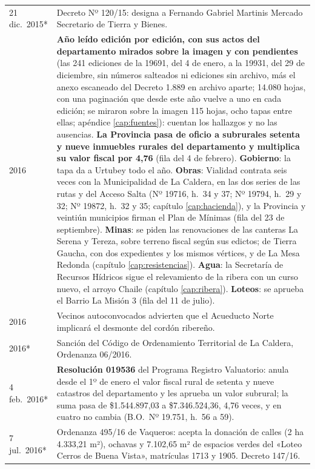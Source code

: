 \begin{longtable}{@{}p{2.7cm}p{10.3cm}@{}}
21 dic.\ 2015* & Decreto Nº 120/15: designa a Fernando Gabriel Martinis Mercado Secretario de Tierra y Bienes. \\
2016 & \textbf{Año leído edición por edición, con sus actos del departamento mirados sobre la imagen y con pendientes} (las 241 ediciones de la 19691, del 4 de enero, a la 19931, del 29 de diciembre, sin números salteados ni ediciones sin archivo, más el anexo escaneado del Decreto 1.889 en archivo aparte; 14.080 hojas, con una paginación que desde este año vuelve a uno en cada edición; se miraron sobre la imagen 115 hojas, ocho tapas entre ellas; apéndice \ref{cap:fuentes}): cuentan los hallazgos y no las ausencias. \textbf{La Provincia pasa de oficio a subrurales setenta y nueve inmuebles rurales del departamento y multiplica su valor fiscal por 4,76} (fila del 4 de febrero). \textbf{Gobierno}: la tapa da a Urtubey todo el año. \textbf{Obras}: Vialidad contrata seis veces con la Municipalidad de La Caldera, en las dos series de las rutas y del Acceso Salta (Nº 19716, h.\ 34 y 37; Nº 19794, h.\ 29 y 32; Nº 19872, h.\ 32 y 35; capítulo \ref{cap:hacienda}), y la Provincia y veintiún municipios firman el Plan de Mínimas (fila del 23 de septiembre). \textbf{Minas}: se piden las renovaciones de las canteras La Serena y Tereza, sobre terreno fiscal según sus edictos; de Tierra Gaucha, con dos expedientes y los mismos vértices, y de La Mesa Redonda (capítulo \ref{cap:resistencias}). \textbf{Agua}: la Secretaría de Recursos Hídricos sigue el relevamiento de la ribera con un curso nuevo, el arroyo Chaile (capítulo \ref{cap:ribera}). \textbf{Loteos}: se aprueba el Barrio La Misión 3 (fila del 11 de julio). \\
2016 & Vecinos autoconvocados advierten que el Acueducto Norte implicará el desmonte del cordón ribereño. \\
2016* & Sanción del Código de Ordenamiento Territorial de La Caldera, Ordenanza 06/2016. \\
4 feb.\ 2016* & \textbf{Resolución 019536} del Programa Registro Valuatorio: anula desde el 1º de enero el valor fiscal rural de setenta y nueve catastros del departamento y les aprueba un valor subrural; la suma pasa de \$1.544.897,03 a \$7.346.524,36, 4,76 veces, y en cuatro no cambia (B.O.\ Nº 19.751, h.\ 56 a 59). \\
7 jul.\ 2016* & Ordenanza 495/16 de Vaqueros: acepta la donación de calles (2 ha 4.333,21 m²), ochavas y 7.102,65 m² de espacios verdes del «Loteo Cerros de Buena Vista», matrículas 1713 y 1905. Decreto 147/16. \\

\end{longtable}
